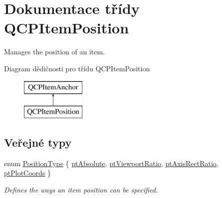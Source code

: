 \hypertarget{classQCPItemPosition}{}\section{Dokumentace třídy Q\+C\+P\+Item\+Position}
\label{classQCPItemPosition}


Manages the position of an item.  


Diagram dědičnosti pro třídu Q\+C\+P\+Item\+Position\begin{figure}[H]
\begin{center}
\leavevmode
\includegraphics[height=2.000000cm]{classQCPItemPosition}
\end{center}
\end{figure}
\subsection*{Veřejné typy}
\begin{DoxyCompactItemize}
\item 
enum \hyperlink{classQCPItemPosition_aad9936c22bf43e3d358552f6e86dbdc8}{Position\+Type} \{ \hyperlink{classQCPItemPosition_aad9936c22bf43e3d358552f6e86dbdc8a564f5e53e550ead1ec5fc7fc7d0b73e0}{pt\+Absolute}, 
\hyperlink{classQCPItemPosition_aad9936c22bf43e3d358552f6e86dbdc8ac7d6aa89ceacb39658b0d6da061c789a}{pt\+Viewport\+Ratio}, 
\hyperlink{classQCPItemPosition_aad9936c22bf43e3d358552f6e86dbdc8a01080fd00eaf09fa238ef6b73bbfef75}{pt\+Axis\+Rect\+Ratio}, 
\hyperlink{classQCPItemPosition_aad9936c22bf43e3d358552f6e86dbdc8ad5ffb8dc99ad73263f7010c77342294c}{pt\+Plot\+Coords}
 \}\begin{DoxyCompactList}\small\item\em Defines the ways an item position can be specified. \end{DoxyCompactList}
\end{DoxyCompactItemize}
